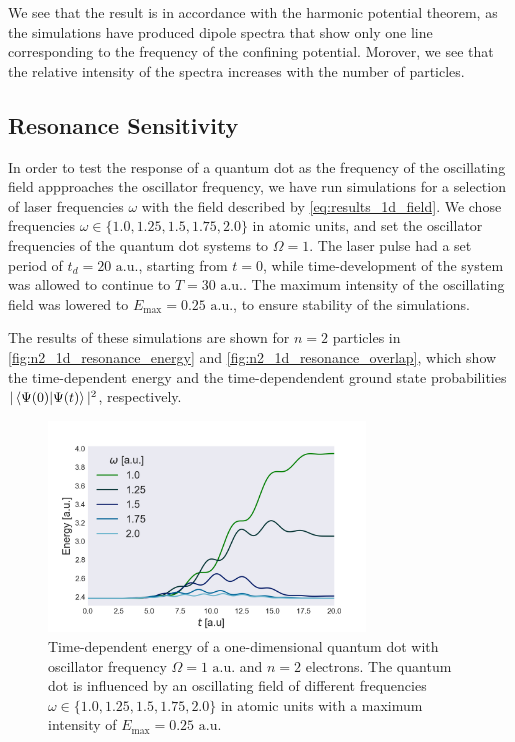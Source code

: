 We see that the result is in accordance with the harmonic potential theorem, as the 
simulations have produced dipole spectra that show only one line corresponding to the 
frequency of the confining potential. Morover, we see that the relative intensity of 
the spectra increases with the number of particles.

\subsection{Resonance Sensitivity}

In order to test the response of a quantum dot as the frequency of the oscillating 
field appproaches the oscillator frequency, we have run simulations for a selection 
of laser frequencies $\omega$ with the field described by \autoref{eq:results_1d_field}.
We chose frequencies $\omega\in\{1.0, 1.25, 1.5, 1.75, 2.0\}$ in atomic units, and set the 
oscillator frequencies of the quantum dot systems to $\Omega=1$. The laser pulse 
had a set period of $t_d=20 \text{ a.u.}$, starting from $t=0$, while time-development 
of the system was allowed to continue to $T=30 \text{ a.u.}$. The maximum intensity 
of the oscillating field was lowered to $E_\text{max} = 0.25 \text{ a.u.}$,
to ensure stability of the simulations. 

The results of these 
simulations are shown for $n=2$ particles in \autoref{fig:n2_1d_resonance_energy}
and \autoref{fig:n2_1d_resonance_overlap}, which show the time-dependent energy 
and the time-dependendent ground state probabilities
$|\braket{\Psi(0)}{\Psi(t)}|^2$, respectively.

\begin{figure}
    \centering
    \includegraphics[width=0.75\textwidth]{results/figures/1D/n2_resonance_energy.png} 
    \caption{Time-dependent energy of a one-dimensional quantum dot with
        oscillator frequency $\Omega=1\text{ a.u.}$ and $n=2$ electrons.
        The quantum dot is influenced by an oscillating field of different 
        frequencies $\omega\in\{1.0, 1.25, 1.5, 1.75, 2.0\}$ in atomic units
        with a maximum 
        intensity of $E_\text{max} = 0.25\text{ a.u.}$
    }
    \label{fig:n2_1d_resonance_energy}
\end{figure}


